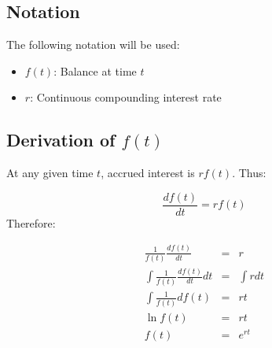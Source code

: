 \subsection{Notation}
The following notation will be used:\par
\begin{itemize}
    \item
    $f(t)$: Balance at time $t$
    \item
    $r$: Continuous compounding interest rate
\end{itemize}
\subsection{Derivation of $f(t)$}
At any given time $t$, accrued interest is $rf(t)$. Thus:\par
\[\frac{df(t)}{dt}=rf(t)\]
Therefore:\par
\[
    \begin{array}{lcl}
        \frac{1}{f(t)}\frac{df(t)}{dt} &= &r\\
        \int{\frac{1}{f(t)}\frac{df(t)}{dt}}{dt} &= &\int{r}{dt}\\
        \int{\frac{1}{f(t)}}{df(t)} &= &rt\\
        \ln{f(t)} &= &rt\\
        f(t) &= &e^{rt}\\
    \end{array}
\]
